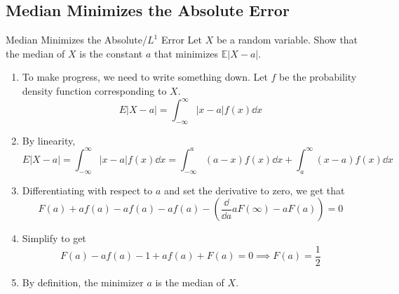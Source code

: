 \documentclass[../main]{subfiles}
\begin{document}
\subsection{Median Minimizes the Absolute Error}
\begin{bbox}{Median Minimizes the Absolute/$L^1$ Error}
    Let $X$ be a random variable. Show that the median of $X$ is the constant $a$ that minimizes $\mathbb E |X-a|$.
\end{bbox}
\begin{solution}
    \begin{enumerate}
        \item To make progress, we need to write something down. Let $f$ be the probability density function corresponding to $X$.
        \[
        E |X-a| = \int_{-\infty}^\infty |x-a| f(x)\dd x
        \]
        \item By linearity,
        \[
        E |X-a| = \int_{-\infty}^\infty |x-a| f(x)\dd x = \int_{-\infty}^a (a-x) f(x)  \dd x + \int_{a}^\infty (x-a) f(x) \dd x
        \]
        \item Differentiating with respect to $a$ and set the derivative to zero, we get that
        \[
        F(a) + af(a) - af(a) - af(a) - (\frac{\dd}{\dd a} aF(\infty) - aF(a)) = 0
        \]
        \item Simplify to get 
        \[
        F(a) - a f(a) - 1 + af(a) + F(a) = 0 \implies F(a) = \frac{1}{2}
        \]
        \item By definition, the minimizer $a$ is the median of $X$.
    \end{enumerate}
\end{solution}
\end{document}
